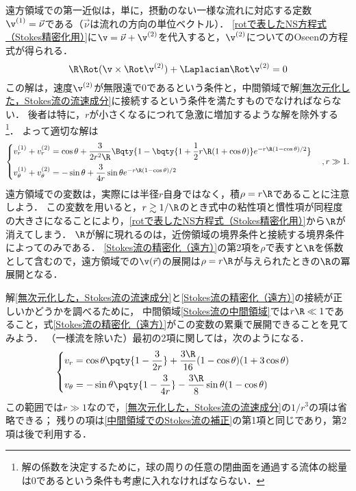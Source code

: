 遠方領域での第一近似は，単に，摂動のない一様な流れに対応する定数$\v^{(1)}=\vec{\nu}$である（$\vec{\nu}$は流れの方向の単位ベクトル）．
\eqref{rotで表したNS方程式（Stokes精密化用）}に$\v = \vec{\nu} + \v^{(2)}$を代入すると，$\v^{(2)}$についてのOseenの方程式が得られる．
\begin{equation}
    \R \Rot(\v\times\Rot\v^{(2)}) + \Laplacian\Rot\v^{(2)} = 0
\end{equation}
この解は，速度$\v^{(2)}$が無限遠で0であるという条件と，中間領域で解\eqref{無次元化した，Stokes流の流速成分}に接続するという条件を満たすものでなければならない．
後者は特に，$r$が小さくなるにつれて急激に増加するような解を除外する
\footnote{解の係数を決定するために，球の周りの任意の閉曲面を通過する流体の総量は0であるという条件も考慮に入れなければならない．}．
よって適切な解は
\begin{equation}\label{Stokes流の精密化（遠方）}
    \begin{cases}
        v_r^{(1)} + v_r^{(2)} = \cos\theta + \dfrac{3}{2r^2\R} \Bqty{ 1-\bqty{ 1+\dfrac{1}{2}r\R(1+\cos\theta) } e^{-r\R(1-\cos\theta)/2} } \\[8pt]
        v_{\theta}^{(1)} + v_{\theta}^{(2)} = -\sin\theta + \dfrac{3}{4r}\sin\theta e^{-r\R(1-\cos\theta)/2} \\
    \end{cases},
    r\gg 1 .
\end{equation}
遠方領域での変数は，実際には半径$r$自身ではなく，積$\rho=r\R$であることに注意しよう．
この変数を用いると，$r \gtrsim 1/\R$のとき式中の粘性項と慣性項が同程度の大きさになることにより，\eqref{rotで表したNS方程式（Stokes精密化用）}から$\R$が消えてしまう．
$\R$が解に現れるのは，近傍領域の境界条件と接続する境界条件によってのみである．
\eqref{Stokes流の精密化（遠方）}の第2項を$\rho$で表すと$\R$を係数として含むので，遠方領域での$\v(\vec{r})$の展開は$\rho=r\R$が与えられたときの$\R$の冪展開となる．



解\eqref{無次元化した，Stokes流の流速成分}と\eqref{Stokes流の精密化（遠方）}の接続が正しいかどうかを調べるために，
中間領域\eqref{Stokes流の中間領域}では$r\R \ll 1$であること，式\eqref{Stokes流の精密化（遠方）}がこの変数の累乗で展開できることを見てみよう．
（一様流を除いた）最初の2項に関しては，次のようになる．
\begin{equation}\label{中間領域でのStokes流の補正}
    \begin{cases}
        v_r = \cos\theta \pqty{1-\dfrac{3}{2r}} + \dfrac{3\R}{16} (1-\cos\theta)(1+3\cos\theta) \\[7pt]
        v_\theta = -\sin\theta \pqty{1-\dfrac{3}{4r}} - \dfrac{3\R}{8} \sin\theta(1-\cos\theta) \\
    \end{cases}
\end{equation}
この範囲では$r\gg1$なので，\eqref{無次元化した，Stokes流の流速成分}の$1/r^3$の項は省略できる；
残りの項は\eqref{中間領域でのStokes流の補正}の第1項と同じであり，第2項は後で利用する．




